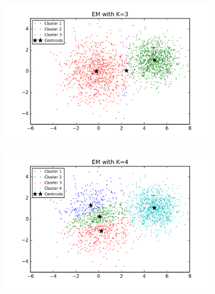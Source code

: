 \begin{figure}[htb]
        \centering
        \begin{subfigure}[b]{0.475\textwidth}
            \centering
            \includegraphics[width=\textwidth]{./figures/clustering_EM_3.png}
        \end{subfigure}
        \hfill
        \begin{subfigure}[b]{0.475\textwidth}  
            \centering 
            \includegraphics[width=\textwidth]{./figures/clustering_EM_4.png}
        \end{subfigure}
        \begin{subfigure}[b]{0.475\textwidth}  
            \centering 

\end{subfigure}
\end{figure}
